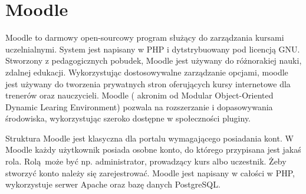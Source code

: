 \chapter{Moodle}
\label{cha:moodle}

Moodle to darmowy open-sourcowy program służący do zarządzania kursami uczelnialnymi. System jest napisany w PHP i dytstrybuowany pod licencją GNU. Stworzony z pedagogicznych pobudek, Moodle jest używany do różnorakiej nauki, zdalnej edukacji. Wykorzystując dostosowywalne zarządzanie opcjami, moodle jest używany do tworzenia prywatnych stron oferujących kursy internetowe dla trenerów oraz nauczycieli. Moodle ( akronim od Modular Object-Oriented Dynamic Learing Environment) pozwala na rozszerzanie i dopasowywania środowiska, wykorzystując szeroko dostępne w społeczności pluginy.

Struktura Moodle jest klasyczna dla portalu wymagającego posiadania kont. W Moodle każdy użytkownik posiada osobne konto, do którego przypisana jest jakaś rola. Rolą może być np. administrator, prowadzący kurs albo uczestnik. Żeby stworzyć konto należy się zarejestrować. Moodle jest napisany w całości w PHP, wykorzystuje serwer Apache oraz bazę danych PostgreSQL.
